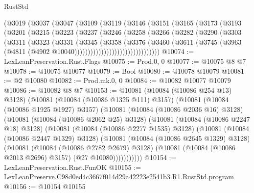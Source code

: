 \begin{lexlean}{RustStd}
\begin{coremodule}
    (@3019
      (@3037
        (@3047
          (@3109
            (@3119
              (@3146
                (@3151
                  (@3165
                    (@3173
                      (@3193
                        (@3201
                          (@3215
                            (@3223
                              (@3237
                                (@3246
                                  (@3258
                                    (@3266
                                      (@3282
                                        (@3290
                                          (@3303
                                            (@3311
                                              (@3323
                                                (@3331
                                                  (@3345
                                                    (@3358
                                                      (@3376
                                                        (@3460
                                                          (@3611
                                                            (@3745
                                                              (@3963
                                                                (@4811
                                                                  (@4902
                                                                    @10040))))))))))))))))))))))))))))))))
@10074 := LexLeanPreservation.Rust.Flags
@10075 := Prod.{0, 0}
@10077 := @10075 @8 @7
@10078 := @10075 @10077
@10079 := Bool
@10080 := @10078 @10079
@10081 := @2 @10080
@10082 := Prod.mk.{0, 0}
@10084 := @10082 @10077 @10079
@10086 := @10082 @8 @7
@10153 := @10081
    (@10084 (@10086 @254 @13) @3128)
    (@10081
      (@10084 (@10086 @1325 @111) @3157)
      (@10081
        (@10084 (@10086 @1925 @1927) @3157)
        (@10081
          (@10084 (@10086 @2036 @16) @3128)
          (@10081
            (@10084 (@10086 @2062 @25) @3128)
            (@10081
              (@10084 (@10086 @2247 @18) @3128)
              (@10081
                (@10084 (@10086 @2277 @1535) @3128)
                (@10081
                  (@10084 (@10086 @2447 @1329) @3128)
                  (@10081
                    (@10084 (@10086 @2645 @1329) @3128)
                    (@10081
                      (@10084 (@10086 @2782 @2679) @3128)
                      (@10081 (@10084 (@10086 @2013 @2696) @3157) (@27 @10080)))))))))))
@10154 := LexLeanPreservation.Rust.FunOK
@10155 := LexLeanPreserve.C98d0ed4c3667f014d29a42223e2541b3.R1.RustStd.program
@10156 := @10154 @10155

\end{coremodule}
\end{lexlean}
